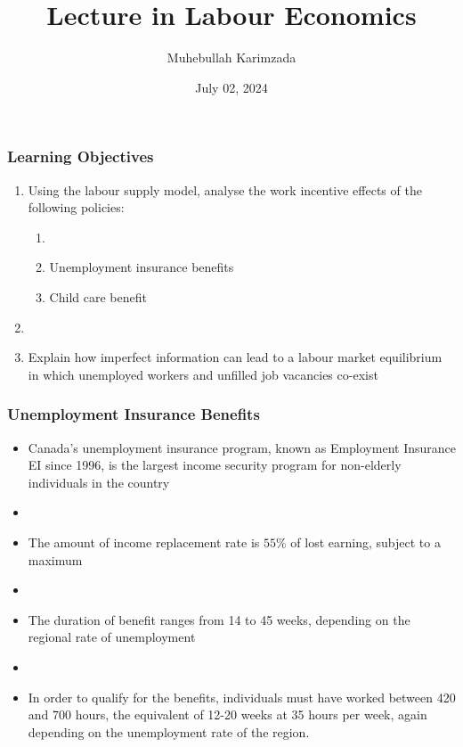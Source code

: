 \documentclass[blue]{beamer}
\title{Lecture in Labour Economics}
\subtitle{ }
\author[Karimzada]{Muhebullah Karimzada}
\institute{\textit{McMaster University}}
\date[ ]{July 02, 2024}
\begin{document}
\frame{\titlepage}
\label{Learning Objectives}
\begin{frame} \frametitle{Learning Objectives}

 		 	\begin{enumerate}
 		 
 		\item 	Using the labour supply model, analyse the work incentive effects of the following policies:
 		
 		\begin{enumerate}[a]
 		 \item []
 		\item Unemployment insurance benefits
 		
 		 \item Child care benefit
 		\end{enumerate}
 		   \item []
 		   \item Explain how imperfect information can lead to a labour market equilibrium in which unemployed workers and unfilled job vacancies co-exist
         \end{enumerate}
        
\end{frame}



\begin{frame} \frametitle{Unemployment Insurance Benefits}
\label{Unemployment Insurance Benefits}

\begin{itemize}
\item Canada's unemployment insurance program, known as Employment Insurance EI since 1996, is the largest income security program for non-elderly individuals in the country
\item[]
\item The amount of income replacement rate is $55\%$ of lost earning, subject to a maximum
\item[]
\item The duration of benefit ranges from 14 to 45 weeks, depending on the regional rate of unemployment
\item[]
 \item In order to qualify for the benefits, individuals must have worked between 420 and 700 hours, the equivalent of 12-20 weeks at 35 hours per week, again depending on the unemployment rate of the region.
 \end{itemize}
 \end{frame}
\end{document}

